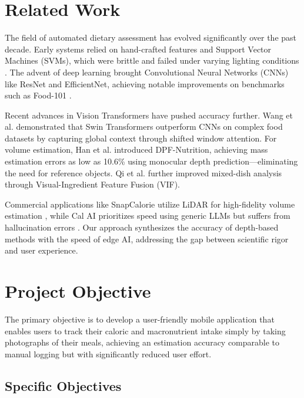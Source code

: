 \documentclass[fleqn,10pt]{SelfArx} %
\begin{document}

\section{Related Work}

The field of automated dietary assessment has evolved significantly over the past decade. Early systems relied on hand-crafted features and Support Vector Machines (SVMs), which were brittle and failed under varying lighting conditions \cite{prenet2024}. The advent of deep learning brought Convolutional Neural Networks (CNNs) like ResNet and EfficientNet, achieving notable improvements on benchmarks such as Food-101 \cite{multimodalfood2024}.

Recent advances in Vision Transformers have pushed accuracy further. Wang et al. \cite{wang2024swin} demonstrated that Swin Transformers outperform CNNs on complex food datasets by capturing global context through shifted window attention. For volume estimation, Han et al. \cite{han2023dpf} introduced DPF-Nutrition, achieving mass estimation errors as low as 10.6\% using monocular depth prediction---eliminating the need for reference objects. Qi et al. \cite{qi2025vif} further improved mixed-dish analysis through Visual-Ingredient Feature Fusion (VIF).

Commercial applications like SnapCalorie utilize LiDAR for high-fidelity volume estimation \cite{nutritioncoaching2025}, while Cal AI prioritizes speed using generic LLMs but suffers from hallucination errors \cite{lifehacker2024}. Our approach synthesizes the accuracy of depth-based methods with the speed of edge AI, addressing the gap between scientific rigor and user experience.


\section{Project Objective}

The primary objective is to develop a user-friendly mobile application that enables users to track their caloric and macronutrient intake simply by taking photographs of their meals, achieving an estimation accuracy comparable to manual logging but with significantly reduced user effort.

\subsection{Specific Objectives}
\end{document}
